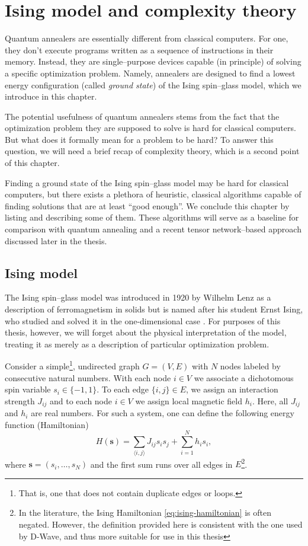 \chapter{Ising model and complexity theory}


Quantum annealers are essentially different from classical computers. For one, they don't
execute programs written as a sequence of instructions in their memory. Instead, they are
single--purpose devices capable (in principle) of solving a specific optimization problem. 
Namely, annealers are designed to find a lowest energy configuration (called \emph{ground state})
of the Ising spin--glass model, which we introduce in this chapter.

The potential usefulness of quantum annealers stems from the fact that the optimization problem they
are supposed to solve is hard for classical computers. But what does it formally mean for a problem
to be hard? To answer this question, we will need a brief recap of complexity theory, which is a
second point of this chapter.

Finding a ground state of the Ising spin--glass model may be hard for classical computers, but
there exists a plethora of heuristic, classical algorithms capable of finding solutions that are at
least ``good enough''. We conclude this chapter by listing and describing some of them.
These algorithms will serve as a baseline for comparison with quantum annealing and a recent
tensor network--based approach discussed later in the thesis.

\section{Ising model}

The Ising spin--glass model was introduced in 1920 by Wilhelm Lenz \cite{lenz} as a description of
ferromagnetism in solids but is named after his student Ernst Ising, who studied and solved it in
the one-dimensional case \cite{ising}. For purposes of this thesis, however, we will forget about
the physical interpretation of the model, treating it as merely as a description of particular
optimization problem.

Consider a simple\footnote{That is, one that does not contain duplicate edges or loops.}, undirected
graph $G = (V, E)$ with $N$ nodes labeled by consecutive natural numbers.  With each node $i \in V$
we associate a dichotomous spin variable $s_i \in \{-1, 1\}$. To each edge $\{i, j\} \in E$, we
assign an interaction strength $J_{ij}$ and to each node $i \in V$ we assign local magnetic field
$h_i$. Here, all $J_{ij}$ and $h_i$ are real numbers. For such a system, one can define the
following energy function (Hamiltonian)
\begin{equation}
\label{eq:ising-hamiltonian}
H(\mathbf{s}) = \sum_{\langle i, j \rangle} J_{ij} s_i s_j +  \sum_{i=1}^N h_i s_i,
\end{equation}
where $\mathbf{s} = (s_i, \ldots, s_N)$ and the first sum runs over all edges in $E$\footnote{In the
literature, the Ising Hamiltonian \eqref{eq:ising-hamiltonian} is often negated. However, the
definition provided here is consistent with the one used by D-Wave, and thus more suitable for use
in this thesis}.

